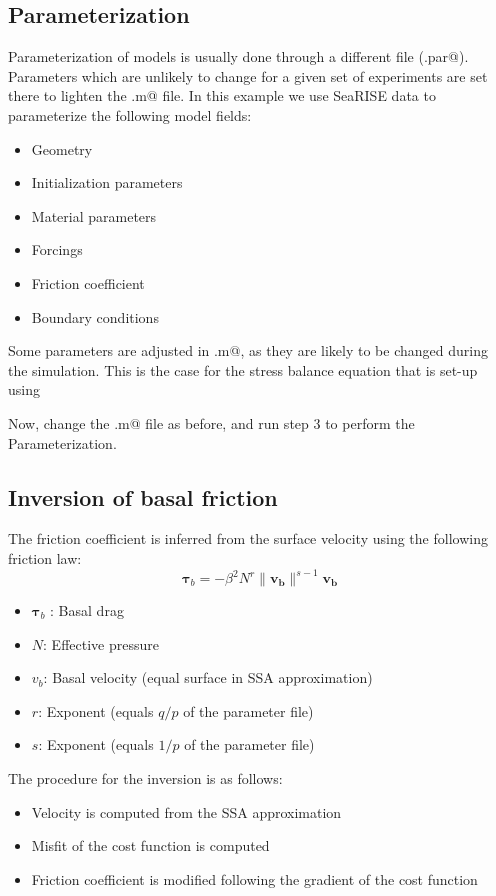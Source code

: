 \subsection{Parameterization}%
Parameterization of models is usually done through a different file (\verb@Pig.par@). Parameters which are unlikely to change for a given set of experiments are set there to lighten the \verb@runme.m@ file. In this example we use SeaRISE data to parameterize the following model fields:

\begin{itemize}
	\item Geometry
	\item Initialization parameters
	\item Material parameters
	\item Forcings
	\item Friction coefficient
	\item Boundary conditions
\end{itemize}

Some parameters are adjusted in \verb@runme.m@, as they are likely to be changed during the simulation. This is the case for the stress balance equation that is set-up using \verb@setflowequation@

Now, change the \verb@runme.m@ file as before, and run step 3 to perform the Parameterization.
\subsection{Inversion of basal friction}%
The friction coefficient is inferred from the surface velocity using the following friction law:
\begin{equation}
	\mathbf{ \tau }_b = -\beta^{2} N^r \|\mathbf{v_b}\|^{s-1}\mathbf{v_b}
\end{equation}

\begin{itemize}
	\item $\mathbf{ \tau }_b$ : Basal drag
	\item $N$: Effective pressure
	\item $v_b$: Basal velocity (equal surface in SSA approximation)
	\item $r$: Exponent (equals $q/p$ of the parameter file)
	\item $s$: Exponent (equals $1/p$ of the parameter file)
\end{itemize}

The procedure for the inversion is as follows:
\begin{itemize}
	\item Velocity is computed from the SSA approximation
	\item Misfit of the cost function is computed
	\item Friction coefficient is modified following the gradient of the cost function
\end{itemize}

